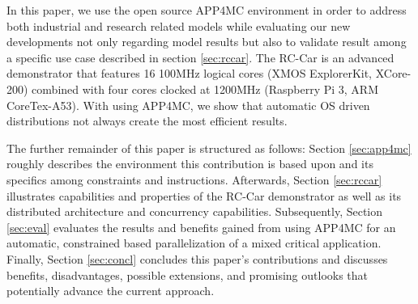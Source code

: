 \documentclass [a4paper,final,conference,10pt]{IDAACS}
\begin{document}
In this paper, we use the open source APP4MC environment in order to address both industrial and research related models while evaluating our new developments not only regarding model results but also to validate result among a specific use case described in section \ref{sec:rccar}. The RC-Car is an advanced demonstrator that features 16 100MHz logical cores (XMOS ExplorerKit, XCore-200) 
combined with four cores clocked at 1200MHz (Raspberry Pi 3, ARM CoreTex-A53). With using APP4MC, we show that automatic OS driven distributions not always create the most efficient results.

The further remainder of this paper is structured as follows: Section \ref{sec:app4mc} roughly describes the environment this contribution is based upon and its specifics among constraints and instructions. Afterwards, Section \ref{sec:rccar} illustrates capabilities and properties of the RC-Car demonstrator as well as its distributed architecture and concurrency capabilities. Subsequently, Section \ref{sec:eval} evaluates the results and benefits gained from using APP4MC for an automatic, constrained based parallelization of a mixed critical application. %
Finally, Section \ref{sec:concl} concludes this paper's contributions and discusses benefits, disadvantages, possible extensions, and promising outlooks that potentially advance the current approach.
\end{document}
